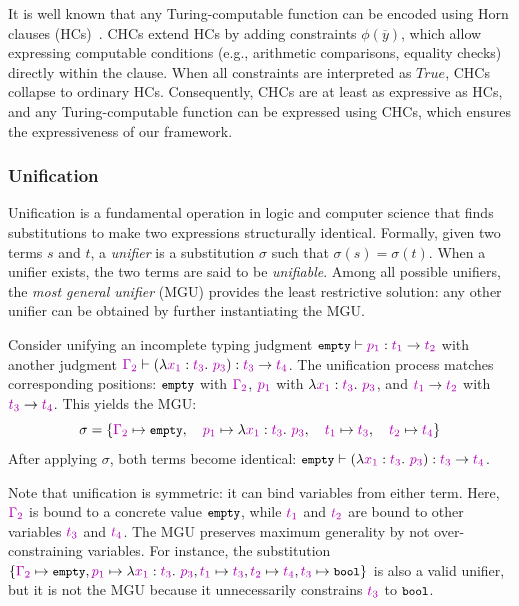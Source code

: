 \documentclass[manuscript,screen]{acmart}
\newcommand{\stlctype}[3]{{#1} \vdash {#2} : {#3}}
\newcommand{\sk}[1]{\textcolor{skunknown}{#1}}
\newcommand{\tcode}[1]{{\small \texttt{\spaceskip=0.2em #1}}}
\begin{document}
It is well known that any Turing-computable function can be encoded using Horn clauses (HCs)~\cite{DBLP:journals/bit/Tarnlund77}. CHCs extend HCs by adding constraints $\phi(\overline{y})$, which allow expressing computable conditions (e.g., arithmetic comparisons, equality checks) directly within the clause. When all constraints are interpreted as $\mathit{True}$, CHCs collapse to ordinary HCs. Consequently, CHCs are at least as expressive as HCs, and any Turing-computable function can be expressed using CHCs, which ensures the expressiveness of our framework.

\subsubsection{Unification}
Unification is a fundamental operation in logic and computer science that finds substitutions to make two expressions structurally identical. Formally, given two terms $s$ and $t$, a \emph{unifier} is a substitution $\sigma$ such that $\sigma(s) = \sigma(t)$. When a unifier exists, the two terms are said to be \emph{unifiable}. Among all possible unifiers, the \emph{most general unifier} (MGU) provides the least restrictive solution: any other unifier can be obtained by further instantiating the MGU.

\begin{example}
Consider unifying an incomplete typing judgment $\stlctype{\tcode{empty}}{\sk{p_1}}{\arr{\sk{t_1}}{\sk{t_2}}}$ with another judgment $\stlctype{\sk{\Gamma_2}}{\left(\abs{\sk{x_1}}{\sk{t_3}}{\sk{p_3}}\right)}{\arr{\sk{t_3}}{\sk{t_4}}}$. The unification process matches corresponding positions: $\tcode{empty}$ with $\sk{\Gamma_2}$, $\sk{p_1}$ with $\abs{\sk{x_1}}{\sk{t_3}}{\sk{p_3}}$, and $\arr{\sk{t_1}}{\sk{t_2}}$ with $\arr{\sk{t_3}}{\sk{t_4}}$. This yields the MGU:
\[
\sigma = \{\sk{\Gamma_2} \mapsto \tcode{empty},\quad\sk{p_1} \mapsto \abs{\sk{x_1}}{\sk{t_3}}{\sk{p_3}},\quad\sk{t_1} \mapsto \sk{t_3},\quad\sk{t_2} \mapsto \sk{t_4}\}
\]
After applying $\sigma$, both terms become identical: $\stlctype{\tcode{empty}}{\left(\abs{\sk{x_1}}{\sk{t_3}}{\sk{p_3}}\right)}{\arr{\sk{t_3}}{\sk{t_4}}}$.

Note that unification is symmetric: it can bind variables from either term. Here, $\sk{\Gamma_2}$ is bound to a concrete value $\tcode{empty}$, while $\sk{t_1}$ and $\sk{t_2}$ are bound to other variables $\sk{t_3}$ and $\sk{t_4}$.
The MGU preserves maximum generality by not over-constraining variables. For instance, the substitution $\{\sk{\Gamma_2} \mapsto \tcode{empty}, \sk{p_1} \mapsto \abs{\sk{x_1}}{\sk{t_3}}{\sk{p_3}}, \sk{t_1} \mapsto \sk{t_3}, \sk{t_2} \mapsto \sk{t_4}, \sk{t_3} \mapsto \tcode{bool}\}$ is also a valid unifier, but it is not the MGU because it unnecessarily constrains $\sk{t_3}$ to $\tcode{bool}$.
\end{example}
\end{document}
